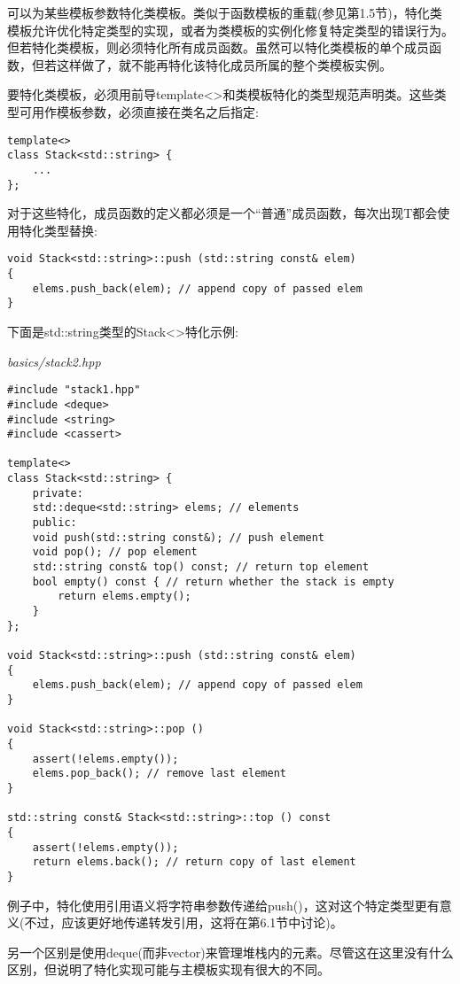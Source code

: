 可以为某些模板参数特化类模板。类似于函数模板的重载(参见第1.5节)，特化类模板允许优化特定类型的实现，或者为类模板的实例化修复特定类型的错误行为。但若特化类模板，则必须特化所有成员函数。虽然可以特化类模板的单个成员函数，但若这样做了，就不能再特化该特化成员所属的整个类模板实例。

要特化类模板，必须用前导template<>和类模板特化的类型规范声明类。这些类型可用作模板参数，必须直接在类名之后指定:

\begin{lstlisting}[style=styleCXX]
template<>
class Stack<std::string> {
	...
};
\end{lstlisting}

对于这些特化，成员函数的定义都必须是一个“普通”成员函数，每次出现T都会使用特化类型替换:

\begin{lstlisting}[style=styleCXX]
void Stack<std::string>::push (std::string const& elem)
{
	elems.push_back(elem); // append copy of passed elem
}
\end{lstlisting}

下面是std::string类型的Stack<>特化示例:

\noindent
\textit{basics/stack2.hpp}
\begin{lstlisting}[style=styleCXX]
#include "stack1.hpp"
#include <deque>
#include <string>
#include <cassert>

template<>
class Stack<std::string> {
	private:
	std::deque<std::string> elems; // elements
	public:
	void push(std::string const&); // push element
	void pop(); // pop element
	std::string const& top() const; // return top element
	bool empty() const { // return whether the stack is empty
		return elems.empty();
	}
};

void Stack<std::string>::push (std::string const& elem)
{
	elems.push_back(elem); // append copy of passed elem
}

void Stack<std::string>::pop ()
{
	assert(!elems.empty());
	elems.pop_back(); // remove last element
}

std::string const& Stack<std::string>::top () const
{
	assert(!elems.empty());
	return elems.back(); // return copy of last element
}
\end{lstlisting}

例子中，特化使用引用语义将字符串参数传递给push()，这对这个特定类型更有意义(不过，应该更好地传递转发引用，这将在第6.1节中讨论)。

另一个区别是使用deque(而非vector)来管理堆栈内的元素。尽管这在这里没有什么区别，但说明了特化实现可能与主模板实现有很大的不同。






















